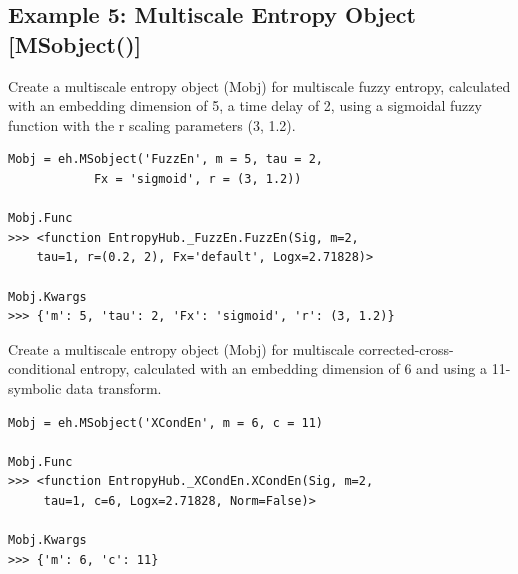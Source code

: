 \documentclass[12pt, a4paper, titlepage, openany]{book}
\begin{document}
\newpage
\subsection{\normalsize Example 5: \hspace{15mm} Multiscale Entropy Object [MSobject()]}
\noindent Create a multiscale entropy object (Mobj) for multiscale fuzzy entropy, calculated with an embedding dimension of 5, a time delay of 2, using a sigmoidal fuzzy function with the r scaling parameters (3, 1.2).
\begin{verbatim}
Mobj = eh.MSobject('FuzzEn', m = 5, tau = 2, 
			Fx = 'sigmoid', r = (3, 1.2))

Mobj.Func
>>> <function EntropyHub._FuzzEn.FuzzEn(Sig, m=2, 
	tau=1, r=(0.2, 2), Fx='default', Logx=2.71828)>
	
Mobj.Kwargs
>>> {'m': 5, 'tau': 2, 'Fx': 'sigmoid', 'r': (3, 1.2)}
\end{verbatim}
Create a multiscale entropy object (Mobj) for multiscale corrected-cross-conditional entropy, calculated with an embedding dimension of 6 and using a 11-symbolic data transform.
\begin{verbatim}
Mobj = eh.MSobject('XCondEn', m = 6, c = 11)

Mobj.Func
>>> <function EntropyHub._XCondEn.XCondEn(Sig, m=2,
	 tau=1, c=6, Logx=2.71828, Norm=False)>

Mobj.Kwargs
>>> {'m': 6, 'c': 11}
\end{verbatim}


\newpage
\end{document}
